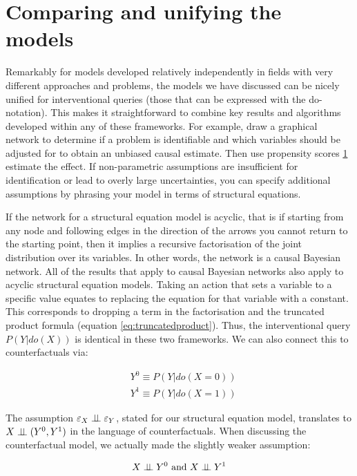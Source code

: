 \documentclass[11pt,a4paper,oneside]{book}
\theoremstyle{plain}
\theoremstyle{definition}
\let\epsilon\varepsilon
\begin{document}
\section{Comparing and unifying the models}

Remarkably for models developed relatively independently in fields with very different approaches and problems, the models we have discussed can be nicely unified for interventional queries (those that can be expressed with the do-notation). This makes it straightforward to combine key results and algorithms developed within any of these frameworks. For example, draw a graphical network to determine if a problem is identifiable and which variables should be adjusted for to obtain an unbiased causal estimate. Then use propensity scores \ref{} estimate the effect. If non-parametric assumptions are insufficient for identification or lead to overly large uncertainties, you can specify additional assumptions by phrasing your model in terms of structural equations. 

If the network for a structural equation model is acyclic, that is if starting from any node and following edges in the direction of the arrows you cannot return to the starting point, then it implies a recursive factorisation of the joint distribution over its variables. In other words, the network is a causal Bayesian network. All of the results that apply to causal Bayesian networks also apply to acyclic structural equation models.  Taking an action that sets a variable to a specific value equates to replacing the equation for that variable with a constant. This corresponds to dropping a term in the factorisation and the truncated product formula (equation \ref{eq:truncatedproduct}). Thus, the interventional query $P(Y|do(X))$ is identical in these two frameworks. We can also connect this to counterfactuals via:

\begin{equation}
\begin{aligned}
&Y^{0} \equiv P(Y|do(X=0)) \\
&Y^{1} \equiv P(Y|do(X=1))
\end{aligned}
\end{equation}

The assumption $\epsilon_{X} \ci \epsilon_{Y}$, stated for our structural equation model, translates to $X \perp\!\!\!\perp (Y^{0},Y^{1})$ in the language of counterfactuals. When discussing the counterfactual model, we actually made the slightly weaker assumption:

\begin{equation}
\label{eq:weakignore}
X \perp\!\!\!\perp Y^{0} \text{ and } X \perp\!\!\!\perp Y^{1}
\end{equation}
\end{document}
